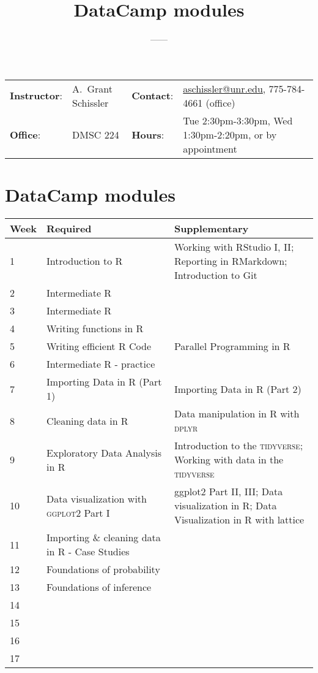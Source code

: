 \documentclass[11pt,onecolumn]{article}
\title{\textbf{\coursename\\DataCamp modules}}
\author{{\semester}---{\roomnumb}---{\classtimes}}
\date{}
\makeatletter
\newcommand{\myname}{A.~Grant Schissler}
\newcommand{\myemail}{aschissler@unr.edu}
\newcommand{\office}{DMSC 224}
\newcommand{\officehours}{Tue 2:30pm-3:30pm, Wed 1:30pm-2:20pm, or by appointment}
\makeatother
\begin{document}
\maketitle

\vspace{-0.25in}
\noindent\makebox[\linewidth]{\rule{\textwidth}{1pt}}

\begin{center}
\begin{tabular}{llll}
\textbf{Instructor}:&\myname & \textbf{Contact}:&\href{mailto:\myemail}{\myemail}, 775-784-4661 (office)\\
\textbf{Office}:&\office & \textbf{Hours}:&\officehours\\
\end{tabular}
\end{center}

\noindent\makebox[\linewidth]{\rule{\textwidth}{1pt}}

\section*{DataCamp modules}
\begin{center}
  \begin{tabular}{|p{0.05\linewidth}|p{0.45\linewidth}|p{0.5\linewidth}|}
    \hline
    Week & Required & Supplementary \\
    \hline
    \hline
    1 & Introduction to R & Working with RStudio I, II; Reporting in RMarkdown; Introduction to Git \\
    \hline
    2 & Intermediate R & \\
    \hline
    3 & Intermediate R & \\
    \hline
    4 & Writing functions in R & \\
    \hline
    5 & Writing efficient R Code & Parallel Programming in R \\ 
    \hline
    6 & Intermediate R - practice & \\
    \hline
    \hline
    7 & Importing Data in R (Part 1) & Importing Data in R (Part 2) \\ 
    \hline
    8 & Cleaning data in R & Data manipulation in R with \textsc{dplyr} \\
    \hline
    9 & Exploratory Data Analysis in R & Introduction to the \textsc{tidyverse}; Working with data in the \textsc{tidyverse} \\
    \hline
    10 & Data visualization with \textsc{ggplot2} Part I & ggplot2 Part II, III; Data visualization in R; Data Visualization in R with lattice \\
    \hline
    11 & Importing \& cleaning data in R - Case Studies &  \\
    \hline
    \hline
    12 & Foundations of probability &  \\
    \hline
    13 & Foundations of inference &  \\
    \hline
    14 & & \\
    \hline
    15 & & \\
    \hline
    16 & & \\
    \hline
    \hline
    17 & & \\
    \hline
\end{tabular}
\end{center}
\end{document}
